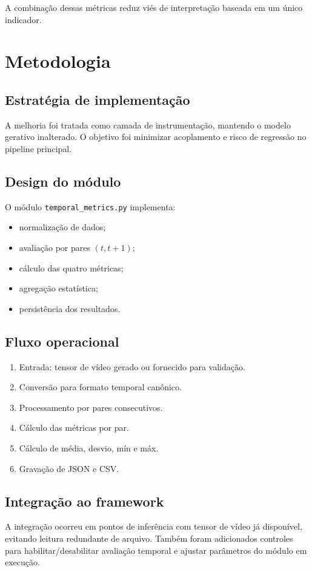\documentclass[conference]{IEEEtran}
\begin{document}
A combinação dessas métricas reduz viés de interpretação baseada em um único indicador.

\section{Metodologia}
\subsection{Estratégia de implementação}
A melhoria foi tratada como camada de instrumentação, mantendo o modelo gerativo inalterado. O objetivo foi minimizar acoplamento e risco de regressão no pipeline principal.

\subsection{Design do módulo}
O módulo \texttt{temporal\_metrics.py} implementa:
\begin{itemize}
    \item normalização de dados;
    \item avaliação por pares $(t, t+1)$;
    \item cálculo das quatro métricas;
    \item agregação estatística;
    \item persistência dos resultados.
\end{itemize}

\subsection{Fluxo operacional}
\begin{enumerate}
    \item Entrada: tensor de vídeo gerado ou fornecido para validação.
    \item Conversão para formato temporal canônico.
    \item Processamento por pares consecutivos.
    \item Cálculo das métricas por par.
    \item Cálculo de média, desvio, mín e máx.
    \item Gravação de JSON e CSV.
\end{enumerate}

\subsection{Integração ao framework}
A integração ocorreu em pontos de inferência com tensor de vídeo já disponível, evitando leitura redundante de arquivo. Também foram adicionados controles para habilitar/desabilitar avaliação temporal e ajustar parâmetros do módulo em execução.
\end{document}

